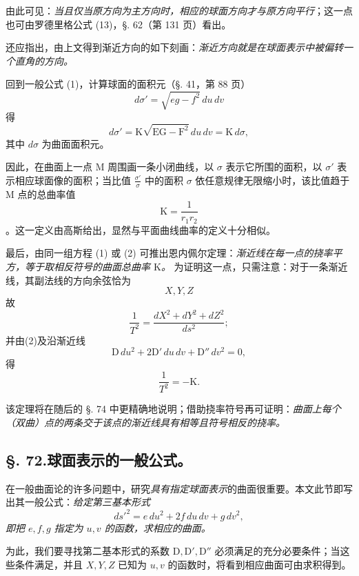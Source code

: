 由此可见：\emph{当且仅当原方向为主方向时，相应的球面方向才与原方向平行}；这一点也可由罗德里格公式 (13)，\S. 62（第 131 页）看出。

还应指出，由上文得到渐近方向的如下刻画：\emph{渐近方向就是在球面表示中被偏转一个直角的方向。}

回到一般公式 (1)，计算球面的面积元（\S. 41，第 88 页）
\[
 d\sigma'=\sqrt{eg-f^2}\,du\,dv
\]
得
\[
 d\sigma'=\mathrm K\sqrt{\mathrm E\mathrm G-\mathrm F^2}\,du\,dv=\mathrm K\,d\sigma,
\]
其中 \(d\sigma\) 为曲面面积元。

因此，在曲面上一点 M 周围画一条小闭曲线，以 \(\sigma\) 表示它所围的面积，以 \(\sigma'\) 表示相应球面像的面积；当比值 \(\frac{\sigma'}{\sigma}\) 中的面积 \(\sigma\) 依任意规律无限缩小时，该比值趋于 M 点的总曲率值
\[
 \mathrm K=\frac1{r_1r_2}
\]
。这一定义由高斯给出，显然与平面曲线曲率的定义十分相似。

最后，由同一组方程 (1) 或 (2) 可推出恩内佩尔定理：\emph{渐近线在每一点的挠率平方，等于取相反符号的曲面总曲率 \(\mathrm K\)。} 为证明这一点，只需注意：对于一条渐近线，其副法线的方向余弦恰为
\[
 X,Y,Z
\]
故
\[
 \frac1{T^2}=\frac{dX^2+dY^2+dZ^2}{ds^2};
\]
并由(2)及沿渐近线
\[
 \mathrm D\,du^2+2\mathrm D'\,du\,dv+\mathrm D''\,dv^2=0,
\]
得
\[
 \frac1{T^2}=-\mathrm K.
\]

该定理将在随后的 \S. 74 中更精确地说明；借助挠率符号再可证明：\emph{曲面上每个（双曲）点的两条交于该点的渐近线具有相等且符号相反的挠率。}


\subsection*{\S. 72.\quad 球面表示的一般公式。}

在一般曲面论的许多问题中，研究\emph{具有指定球面表示}的曲面很重要。本文此节即写出其一般公式：\emph{给定第三基本形式}
\begin{equation}\tag{3}
 ds'^2=e\,du^2+2f\,du\,dv+g\,dv^2,
\end{equation}
\emph{即把 \(e,f,g\) 指定为 \(u,v\) 的函数，求相应的曲面。}

为此，我们要寻找第二基本形式的系数 \(\mathrm D,\mathrm D',\mathrm D''\) 必须满足的充分必要条件；当这些条件满足，并且 \(X,Y,Z\) 已知为 \(u,v\) 的函数时，将看到相应曲面可由求积得到。

